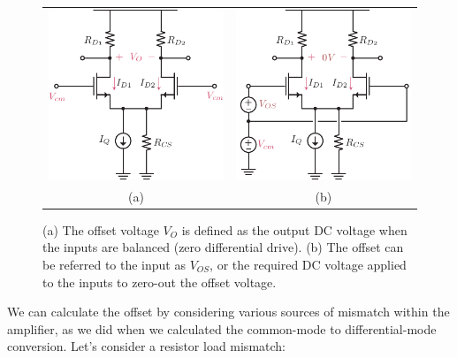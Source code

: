 \begin{figure}[tb]
\centering
\begin{tabular}{cc}
\includegraphics[scale=1]{Diffamp_offset.pdf} &
\includegraphics[scale=1]{Diffamp_offset_input.pdf}\\
(a) & (b)\\
\end{tabular}
\caption{(a) The offset voltage $V_O$ is defined as the output DC voltage when the inputs are balanced (zero differential drive).  (b) The offset can be referred to the input as $V_{OS}$, or the required DC voltage applied to the inputs to zero-out the offset voltage.}
\label{fig:Diffamp_offset.pdf}
\end{figure}
We can calculate the offset by considering various sources of mismatch within the amplifier, as we did when we calculated the common-mode to differential-mode conversion.  Let's consider a resistor load mismatch:
